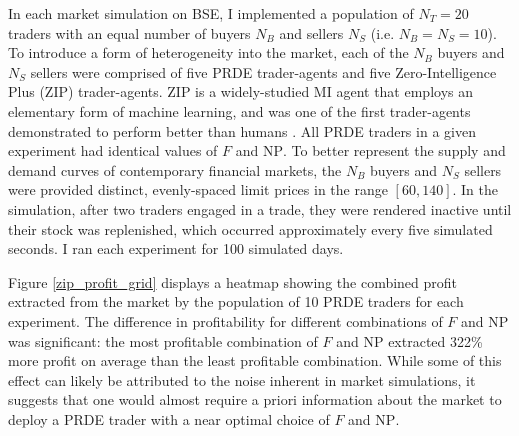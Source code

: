 \documentclass[conference]{IEEEtran}
\begin{document}
In each market simulation on BSE, I implemented a population of $N_T=20$ traders with an equal number of buyers $N_B$ and sellers $N_S$ (i.e. $N_B=N_S=10$).
To introduce a form of heterogeneity into the market, each of the $N_B$ buyers and $N_S$ sellers were comprised of five PRDE trader-agents and five Zero-Intelligence Plus (ZIP) \cite{ZIP} trader-agents.
ZIP is a widely-studied MI agent that employs an elementary form of machine learning, and was one of the first trader-agents demonstrated to perform better than humans \cite{DasHansonKephartTesauro}.
All PRDE traders in a given experiment had identical values of $F$ and $\mathrm{NP}$.
To better represent the supply and demand curves of contemporary financial markets, the $N_B$ buyers and $N_S$ sellers were provided distinct, evenly-spaced limit prices in the range $[60, 140]$.
In the simulation, after two traders engaged in a trade, they were rendered inactive until their stock was replenished, which occurred approximately every five simulated seconds.
I ran each experiment for 100 simulated days.

Figure \ref{zip_profit_grid} displays a heatmap showing the combined profit extracted from the market by the population of 10 PRDE traders for each experiment.
The difference in profitability for different combinations of $F$ and $\mathrm{NP}$ was significant: the most profitable combination of $F$ and $\mathrm{NP}$ extracted 322\% more profit on average than the least profitable combination.
While some of this effect can likely be attributed to the noise inherent in market simulations, it suggests that one would almost require a priori information about the market to deploy a PRDE trader with a near optimal choice of $F$ and $\mathrm{NP}$.
\end{document}
